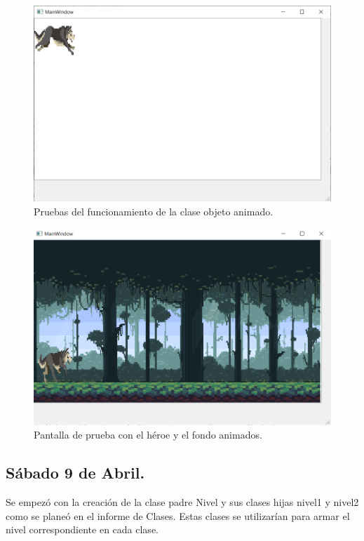 \documentclass{article}
\begin{document}
\newpage
\begin{figure}[h]
\includegraphics[scale=0.6]{Images/animacionInicial.png}
\centering
\caption{Pruebas del funcionamiento de la clase objeto animado.}
\label{fig:animacion1}
\end{figure}

\begin{figure}[h]
\includegraphics[scale=0.6]{Images/animaciones.png}
\centering
\caption{Pantalla de prueba con el héroe y el fondo animados.}
\label{fig:animacion}
\end{figure}

\subsection{Sábado 9 de Abril.}
Se empezó con la creación de la clase padre Nivel y sus clases hijas nivel1 y nivel2 como se planeó en el informe de Clases. Estas clases se utilizarían para armar el nivel correspondiente en cada clase.
\end{document}
